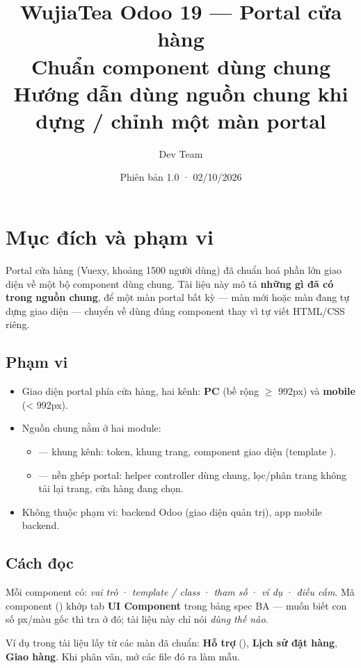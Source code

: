 \documentclass[11pt,a4paper]{report}
\title{\vspace{1cm}\textbf{WujiaTea Odoo 19 --- Portal cửa hàng}\\[0.3cm]\Large Chuẩn component dùng chung\\[0.2cm]\large Hướng dẫn dùng nguồn chung khi dựng / chỉnh một màn portal}
\author{Dev Team}
\date{Phiên bản 1.0 · 02/10/2026}
\begin{document}
\maketitle
\tableofcontents

\chapter{Mục đích và phạm vi}

Portal cửa hàng (Vuexy, khoảng 1500 người dùng) đã chuẩn hoá phần lớn giao diện về một
bộ component dùng chung. Tài liệu này mô tả \textbf{những gì đã có trong nguồn chung},
để một màn portal bất kỳ --- màn mới hoặc màn đang tự dựng giao diện --- chuyển về dùng
đúng component thay vì tự viết HTML/CSS riêng.

\section{Phạm vi}
\begin{itemize}
  \item Giao diện portal phía cửa hàng, hai kênh: \textbf{PC} (bề rộng $\geq$ 992px) và \textbf{mobile} (< 992px).
  \item Nguồn chung nằm ở hai module:
    \begin{itemize}
      \item {} --- khung kênh: token, khung trang, component giao diện (template ).
      \item {} --- nền ghép portal: helper controller dùng chung, lọc/phân trang không tải lại trang, cửa hàng đang chọn.
    \end{itemize}
  \item Không thuộc phạm vi: backend Odoo (giao diện quản trị), app mobile backend.
\end{itemize}

\section{Cách đọc}
Mỗi component có: \emph{vai trò} · \emph{template / class} · \emph{tham số} · \emph{ví dụ} ·
\emph{điều cấm}. Mã component () khớp tab \textbf{UI Component} trong bảng
spec BA --- muốn biết con số px/màu gốc thì tra ở đó; tài liệu này chỉ nói \emph{dùng thế nào}.

Ví dụ trong tài liệu lấy từ các màn đã chuẩn: \textbf{Hỗ trợ} (),
\textbf{Lịch sử đặt hàng}, \textbf{Giao hàng}. Khi phân vân, mở các file đó ra làm mẫu.
\end{document}
